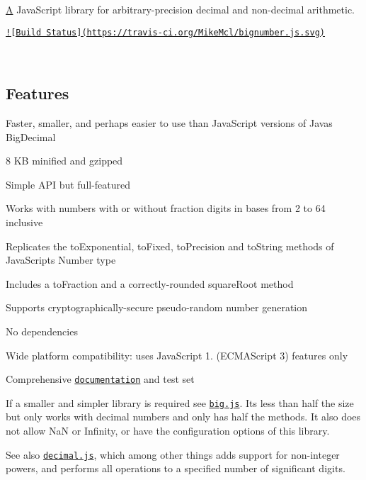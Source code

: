 

\hyperlink{class_a}{A} Java\+Script library for arbitrary-\/precision decimal and non-\/decimal arithmetic.

\href{https://travis-ci.org/MikeMcl/bignumber.js}{\tt !\mbox{[}Build Status\mbox{]}(https\+://travis-\/ci.\+org/\+Mike\+Mcl/bignumber.\+js.\+svg)}

~\newline


\subsection*{Features}


\begin{DoxyItemize}
\item Faster, smaller, and perhaps easier to use than Java\+Script versions of Java\textquotesingle{}s Big\+Decimal
\item 8 K\+B minified and gzipped
\item Simple A\+P\+I but full-\/featured
\item Works with numbers with or without fraction digits in bases from 2 to 64 inclusive
\item Replicates the {\ttfamily to\+Exponential}, {\ttfamily to\+Fixed}, {\ttfamily to\+Precision} and {\ttfamily to\+String} methods of Java\+Script\textquotesingle{}s Number type
\item Includes a {\ttfamily to\+Fraction} and a correctly-\/rounded {\ttfamily square\+Root} method
\item Supports cryptographically-\/secure pseudo-\/random number generation
\item No dependencies
\item Wide platform compatibility\+: uses Java\+Script 1. (E\+C\+M\+A\+Script 3) features only
\item Comprehensive \href{http://mikemcl.github.io/bignumber.js/}{\tt documentation} and test set
\end{DoxyItemize}



If a smaller and simpler library is required see \href{https://github.com/MikeMcl/big.js/}{\tt big.\+js}. It\textquotesingle{}s less than half the size but only works with decimal numbers and only has half the methods. It also does not allow {\ttfamily Na\+N} or {\ttfamily Infinity}, or have the configuration options of this library.

See also \href{https://github.com/MikeMcl/decimal.js/}{\tt decimal.\+js}, which among other things adds support for non-\/integer powers, and performs all operations to a specified number of significant digits.

